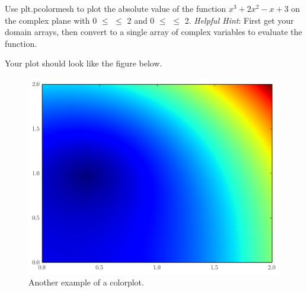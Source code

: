 \begin{problem} Use plt.pcolormesh to plot the absolute value of the function $x^3 +2x^2 -x +3$ on the complex plane with 0 $\leq$  $\leq$ 2 and 0 $\leq$  $\leq$ 2.
\emph{Helpful Hint}: First get your domain arrays, then convert to a single array of complex variables to evaluate the function.

Your plot should look like the figure below.

\begin{figure}[H]
\includegraphics[width=\textwidth]{pcolor2.png}
\caption{Another example of a colorplot.}
\label{fig:pcolormesh}
\end{figure}
\end{problem}

